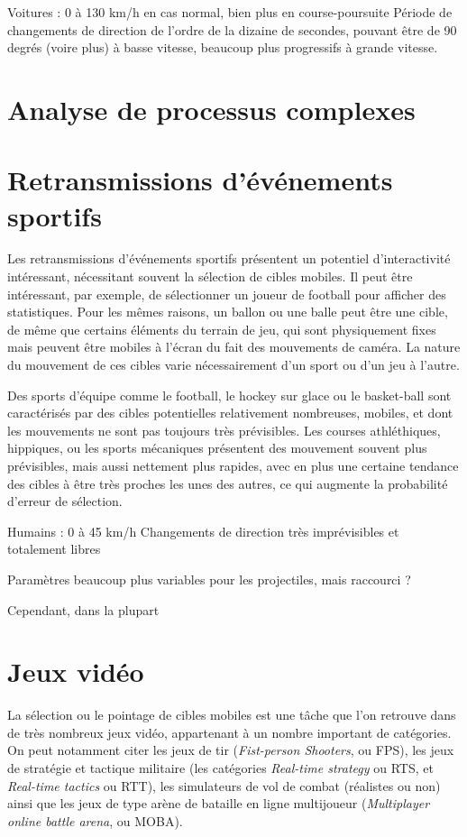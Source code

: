 	Voitures : 0 à 130 km/h en cas normal, bien plus en course-poursuite
	Période de changements de direction de l'ordre de la dizaine de secondes, pouvant être de 90 degrés (voire plus) à basse vitesse, beaucoup plus progressifs à grande vitesse.
	
	\section{Analyse de processus complexes}
	
	\section{Retransmissions d'événements sportifs}
	Les retransmissions d'événements sportifs présentent un potentiel d'interactivité intéressant, nécessitant souvent la sélection de cibles mobiles. Il peut être intéressant, par exemple, de sélectionner un joueur de football pour afficher des statistiques. Pour les mêmes raisons, un ballon ou une balle peut être une cible, de même que certains éléments du terrain de jeu, qui sont physiquement fixes mais peuvent être mobiles à l'écran du fait des mouvements de caméra. La nature du mouvement de ces cibles varie nécessairement d'un sport ou d'un jeu à l'autre.
	
	Des sports d'équipe comme le football, le hockey sur glace ou le basket-ball sont caractérisés par des cibles potentielles relativement nombreuses, mobiles, et dont les mouvements ne sont pas toujours très prévisibles. Les courses athléthiques, hippiques, ou les sports mécaniques présentent des mouvement souvent plus prévisibles, mais aussi nettement plus rapides, avec en plus une certaine tendance des cibles à être très proches les unes des autres, ce qui augmente la probabilité d'erreur de sélection.
	
	Humains : 0 à 45 km/h
	Changements de direction très imprévisibles et totalement libres
	
	Paramètres beaucoup plus variables pour les projectiles, mais raccourci ?
	
	Cependant, dans la plupart 
	
	\section{Jeux vidéo}
	La sélection ou le pointage de cibles mobiles est une tâche que l'on retrouve dans de très nombreux jeux vidéo, appartenant à un nombre important de catégories. On peut notamment citer les jeux de tir (\emph{Fist-person Shooters}, ou FPS), les jeux de stratégie et tactique militaire (les catégories \emph{Real-time strategy} ou RTS, et \emph{Real-time tactics} ou RTT), les simulateurs de vol de combat (réalistes ou non) ainsi que les jeux de type arène de bataille en ligne multijoueur (\emph{Multiplayer online battle arena}, ou MOBA).
	
